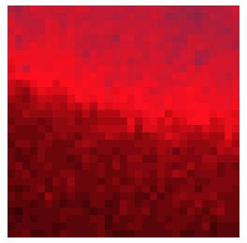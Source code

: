 \documentclass[10pt]{scrartcl}
\begin{document}
\begin{figure}[!ht]
\begin{subfigure}[b]{.3\linewidth}
    \end{subfigure}
    \begin{subfigure}[b]{.3\linewidth}
        \centering
        \includegraphics[width=1.2\linewidth]{../plots_tables_images/1d1dcrop_2_0.eps}
    \end{subfigure}



\end{figure}
\end{document}
